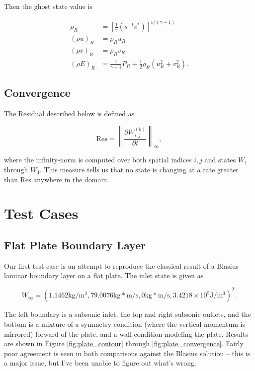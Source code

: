 \documentclass{article}
\begin{document}
Then the ghost state value is

\begin{equation}
\begin{aligned}
\rho_R &= [\frac{1}{\gamma}(s^{-1}c^*)]^{1/(\gamma-1)} \\
(\rho u)_R &= \rho_Ru_R \\
(\rho v)_R &= \rho_Rv_R \\
(\rho E)_R &= \frac{1}{\gamma-1}P_R + \frac{1}{2}\rho_R(u_R^2+v_R^2).
\end{aligned}
\end{equation}

\subsection{Convergence}
The Residual described below is defined as

\begin{equation}
\text{Res} = \left\|\frac{\partial W^{(k)}_{i,j}}{\partial t}\right\|_\infty,
\end{equation}

where the infinity-norm is computed over both spatial indices $i,j$ and states $W_1$ through $W_4$. This measure tells us that no state is changing at a rate greater than Res anywhere in the domain.

\newpage
\section{Test Cases}
\subsection{Flat Plate Boundary Layer}
Our first test case is an attempt to reproduce the classical result of a Blasius laminar boundary layer on a flat plate. The inlet state is given as

\begin{equation*}
W_{\infty} = (1.1462 \text{kg}/\text{m}^3,79.0076\text{kg}*\text{m}/\text{s},0\text{kg}*\text{m}/\text{s},3.4218\times10^5\text{J}/\text{m}^3)^T.
\end{equation*}

The left boundary is a subsonic inlet, the top and right subsonic outlets, and the bottom is a mixture of a symmetry condition (where the vertical momentum is mirrored) forward of the plate, and a wall condition modeling the plate. Results are shown in Figure \ref{fig:plate_contour} through \ref{fig:plate_convergence}. Fairly poor agreement is seen in both comparisons against the Blasius solution -- this is a major issue, but I've been unable to figure out what's wrong.
\end{document}
